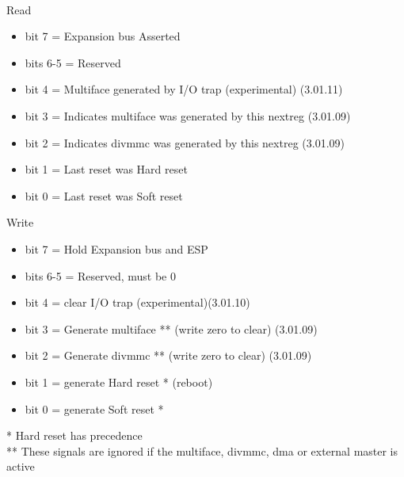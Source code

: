 \\
Read
\begin{itemize}
\item bit 7 = Expansion bus  Asserted
\item bits 6-5 = Reserved
\item bit 4 = Multiface  generated by I/O trap
(experimental) (3.01.11)
\item bit 3 = Indicates multiface  was generated by this
nextreg (3.01.09)
\item bit 2 = Indicates divmmc  was generated by this
nextreg (3.01.09)
\item bit 1 = Last reset was Hard reset
\item bit 0 = Last reset was Soft reset
\end{itemize}
Write
\begin{itemize}
\item bit 7 = Hold Expansion bus and ESP 
\item bits 6-5 = Reserved, must be 0
\item bit 4 = clear I/O trap (experimental)(3.01.10)
\item bit 3 = Generate multiface  **
(write zero to clear) (3.01.09)
\item bit 2 = Generate divmmc  **
(write zero to clear) (3.01.09)
\item bit 1 = generate Hard reset * (reboot)
\item bit 0 = generate Soft reset *
\end{itemize}
* Hard reset has precedence\\
** These signals are ignored if the multiface, divmmc, dma or
external  master is active
